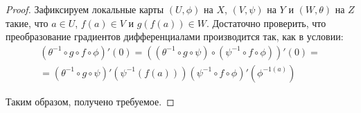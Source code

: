 \begin{proof}
	Зафиксируем локальные карты $(U, \phi)$ на $X$, $(V, \psi)$ на $Y$ и $(W, \theta)$ на $Z$ такие, что $a \in U$, $f(a) \in V$ и $g(f(a)) \in W$. Достаточно проверить, что преобразование градиентов дифференциалами производится так, как в условии:
	\begin{multline*}
		(\theta^{-1}\circ g \circ f \circ \phi)'(0) = \left((\theta^{-1}\circ g \circ \psi) \circ (\psi^{-1} \circ f \circ \phi)\right)'(0) = \\
		=(\theta^{-1}\circ g \circ \psi)'\left(\psi^{-1}(f(a))\right)(\psi^{-1} \circ f \circ \phi)'(\phi^{-1(a)})
	\end{multline*}
	
	Таким образом, получено требуемое.
\end{proof}